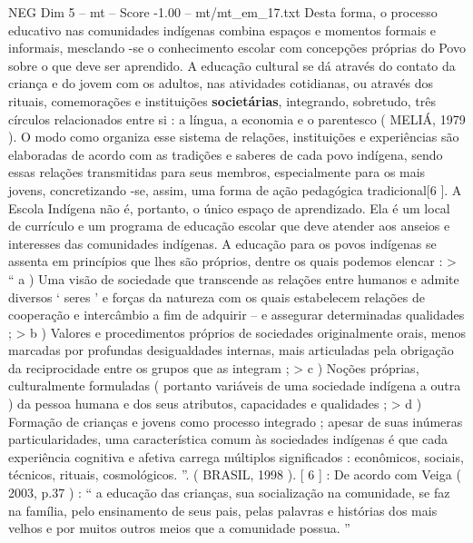 \begin{textsample}{NEG Dim 5 – mt – Score -1.00 – mt/mt\_em\_17.txt}
Desta forma, o processo educativo nas comunidades indígenas combina espaços e momentos formais e informais, mesclando -se o conhecimento escolar com concepções próprias do Povo sobre o que deve ser aprendido.
A educação cultural se dá através do contato da criança e do jovem com os adultos, nas atividades cotidianas, ou através dos rituais, comemorações e instituições \textbf{societárias}, integrando, sobretudo, três círculos relacionados entre si : a língua, a economia e o parentesco ( MELIÁ, 1979 ).
O modo como organiza esse sistema de relações, instituições e experiências são elaboradas de acordo com as tradições e saberes de cada povo indígena, sendo essas relações transmitidas para seus membros, especialmente para os mais jovens, concretizando -se, assim, uma forma de ação pedagógica tradicional[6 ].
A Escola Indígena não é, portanto, o único espaço de aprendizado.
Ela é um local de currículo e um programa de educação escolar que deve atender aos anseios e interesses das comunidades indígenas.
A educação para os povos indígenas se assenta em princípios que lhes são próprios, dentre os quais podemos elencar : > “ a ) Uma visão de sociedade que transcende as relações entre humanos e admite diversos ‘ seres ’ e forças da natureza com os quais estabelecem relações de cooperação e intercâmbio a fim de adquirir – e assegurar determinadas qualidades ; > b ) Valores e procedimentos próprios de sociedades originalmente orais, menos marcadas por profundas desigualdades internas, mais articuladas pela obrigação da reciprocidade entre os grupos que as integram ; > c ) Noções próprias, culturalmente formuladas ( portanto variáveis de uma sociedade indígena a outra ) da pessoa humana e dos seus atributos, capacidades e qualidades ; > d ) Formação de crianças e jovens como processo integrado ; apesar de suas inúmeras particularidades, uma característica comum às sociedades indígenas é que cada experiência cognitiva e afetiva carrega múltiplos significados : econômicos, sociais, técnicos, rituais, cosmológicos. ”. ( BRASIL, 1998 ). [ 6 ] : De acordo com Veiga ( 2003, p.37 ) : “ a educação das crianças, sua socialização na comunidade, se faz na família, pelo ensinamento de seus pais, pelas palavras e histórias dos mais velhos e por muitos outros meios que a comunidade possua. ”

\end{textsample}
